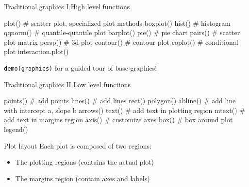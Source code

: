 \documentclass[
  ignorenonframetext,
]{beamer}
\newenvironment{Shaded}{\begin{snugshade}}{\end{snugshade}}
\newcommand{\CommentTok}[1]{\textcolor[rgb]{0.54,0.53,0.53}{#1}}
\newcommand{\FunctionTok}[1]{\textcolor[rgb]{0.39,0.29,0.61}{#1}}
\newcommand{\NormalTok}[1]{\textcolor[rgb]{0.12,0.11,0.11}{#1}}
\providecommand{\tightlist}{%
  \setlength{\itemsep}{0pt}\setlength{\parskip}{0pt}}
\begin{document}
\begin{frame}[fragile]{Traditional graphics I}
\protect\hypertarget{traditional-graphics-i}{}
High level functions

\begin{Shaded}
\begin{Highlighting}[]
\FunctionTok{plot}\NormalTok{()      }\CommentTok{\# scatter plot, specialized plot methods}
\FunctionTok{boxplot}\NormalTok{()}
\FunctionTok{hist}\NormalTok{()      }\CommentTok{\# histogram}
\FunctionTok{qqnorm}\NormalTok{()    }\CommentTok{\# quantile{-}quantile plot}
\FunctionTok{barplot}\NormalTok{()}
\FunctionTok{pie}\NormalTok{()       }\CommentTok{\# pie chart}
\FunctionTok{pairs}\NormalTok{()     }\CommentTok{\# scatter plot matrix}
\FunctionTok{persp}\NormalTok{()     }\CommentTok{\# 3d plot}
\FunctionTok{contour}\NormalTok{()   }\CommentTok{\# contour plot}
\FunctionTok{coplot}\NormalTok{()    }\CommentTok{\# conditional plot}
\FunctionTok{interaction.plot}\NormalTok{()}
\end{Highlighting}
\end{Shaded}

\texttt{demo(graphics)} for a guided tour of base graphics!
\end{frame}

\begin{frame}[fragile]{Traditional graphics II}
\protect\hypertarget{traditional-graphics-ii}{}
Low level functions

\begin{Shaded}
\begin{Highlighting}[]
\FunctionTok{points}\NormalTok{()       }\CommentTok{\# add points}
\FunctionTok{lines}\NormalTok{()        }\CommentTok{\# add lines}
\FunctionTok{rect}\NormalTok{()}
\FunctionTok{polygon}\NormalTok{()}
\FunctionTok{abline}\NormalTok{()       }\CommentTok{\# add line with intercept a, slope b}
\FunctionTok{arrows}\NormalTok{()}
\FunctionTok{text}\NormalTok{()         }\CommentTok{\# add text in plotting region}
\FunctionTok{mtext}\NormalTok{()        }\CommentTok{\# add text in margins region}
\FunctionTok{axis}\NormalTok{()         }\CommentTok{\# customize axes}
\FunctionTok{box}\NormalTok{()          }\CommentTok{\# box around plot}
\FunctionTok{legend}\NormalTok{()}
\end{Highlighting}
\end{Shaded}
\end{frame}

\begin{frame}{Plot layout}
\protect\hypertarget{plot-layout}{}
Each plot is composed of two regions:

\begin{itemize}
\tightlist
\item
  The plotting regions (contains the actual plot)
\item
  The margins region (contain axes and labels)
\end{itemize}
\end{frame}
\end{document}
